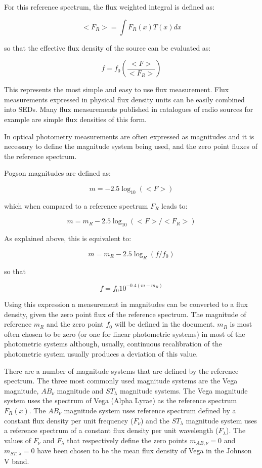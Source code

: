 \documentclass[11pt,a4paper]{ivoa}
\begin{document}
For this reference spectrum, the flux weighted integral is defined as:
\par
\[ <F_R > = \int F_R (x)T(x)dx \]

so that the effective flux density of the source can be evaluated as:\par

\[  f = f_0 ( \frac{<F>}{<F_R >} ) \]

This represents the most simple and easy to use flux measurement. Flux measurements expressed in physical flux density units can be easily combined into SEDs. Many flux measurements published in catalogues of radio sources for example are simple flux densities of this form.
\par

In optical photometry measurements are often expressed as magnitudes and it is necessary to define the magnitude system being used, and the zero point fluxes of the reference spectrum.
\par

Pogson magnitudes are defined as:
\par
\[  m = -2.5\log_{10} (<F>) \]

which when compared to a reference spectrum $F_R$ leads to:
\par
\[  m = m_R -2.5 \log_{10} \left( <F>/<F_R >\right) \]

As explained above, this is equivalent to:
\par
\[ m = m_R - 2.5 \log_{R} (f/f_0 ) \]

so that 
\par
\[ f = f_0 10^{-0.4(m - m_{R})} \]


Using this expression a measurement in magnitudes can be converted to a flux density, given the zero point flux of the reference spectrum.  The magnitude of reference $m_{R}$ and the zero point $f_0$ will be defined in the document. $m_{R}$ is most often chosen to be zero (or one for linear photometric systems) in most of the photometric systems although, usually, continuous recalibration of the photometric system usually produces a deviation of this value.
\par

There are a number of magnitude systems that are defined by the reference spectrum. The three most commonly used magnitude systems are the Vega magnitude, $AB_{\nu }$ magnitude and $ST_{\lambda }$ magnitude systems. The Vega magnitude system uses the spectrum of Vega (Alpha Lyrae) as the reference spectrum $F_R (x)$. The $AB_{\nu }$ magnitude system uses reference spectrum defined by a constant flux density per unit frequency ($F_{\nu }$) and the 
$ST_{\lambda }$ magnitude system uses a reference spectrum of a constant flux density per unit wavelength ($F_{\lambda }$). The values of $F_{\nu }$ and $F_{\lambda }$ that respectively define the zero points 
$m_{AB,\nu } =0$ and 
$m_{ST,\lambda } =0$ have been chosen to be the mean flux density of Vega in the Johnson V band. 
\par
\end{document}
